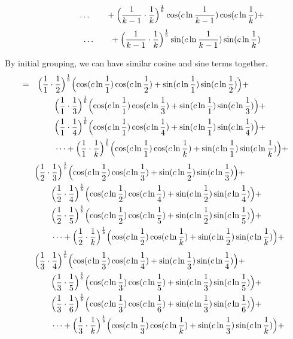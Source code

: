 \documentclass{amsart}
\begin{document}
	\[ \qquad\qquad \dots \qquad + \Bigl( \frac{1}{k-1} \cdot \frac{1}{k} \Bigr)^\frac1b \cos(c \ln \frac{1}{k-1}) \cos(c \ln \frac{1}{k}) +  \]
	\[ \qquad\qquad \dots \qquad + \Bigl( \frac{1}{k-1} \cdot \frac{1}{k} \Bigr)^\frac1b \sin(c \ln \frac{1}{k-1}) \sin(c \ln \frac{1}{k}) \]
	
	\[\]
	By initial grouping, we can have similar cosine and sine terms together.
	\[
	\begin{aligned}
		= \quad & \Bigl( \frac{1}{1} \cdot \frac{1}{2} \Bigr)^\frac1b \Bigl( \cos(c \ln \frac{1}{1}) \cos(c \ln \frac{1}{2}) + \sin(c \ln \frac{1}{1}) \sin(c \ln \frac{1}{2}) \Bigr) + \\
		& \qquad \Bigl( \frac{1}{1} \cdot \frac{1}{3} \Bigr)^\frac1b \Bigl( \cos(c \ln \frac{1}{1}) \cos(c \ln \frac{1}{3}) + \sin(c \ln \frac{1}{1}) \sin(c \ln \frac{1}{3}) \Bigr) + \\
		& \qquad \Bigl( \frac{1}{1} \cdot \frac{1}{4} \Bigr)^\frac1b \Bigl( \cos(c \ln \frac{1}{1}) \cos(c \ln \frac{1}{4}) + \sin(c \ln \frac{1}{1}) \sin(c \ln \frac{1}{4}) \Bigr) + \\
		& \qquad \dots  + \Bigl( \frac{1}{1} \cdot \frac{1}{k} \Bigr)^\frac1b \Bigl( \cos(c \ln \frac{1}{1}) \cos(c \ln \frac{1}{k}) + \sin(c \ln \frac{1}{1}) \sin(c \ln \frac{1}{k}) \Bigr) + 
	\end{aligned}
	\]
	\[
	\begin{aligned}
		\quad & \Bigl( \frac{1}{2} \cdot \frac{1}{3} \Bigr)^\frac1b \Bigl( \cos(c \ln \frac{1}{2}) \cos(c \ln \frac{1}{3}) + \sin(c \ln \frac{1}{2}) \sin(c \ln \frac{1}{3}) \Bigr) + \\
		& \qquad \Bigl( \frac{1}{2} \cdot \frac{1}{4} \Bigr)^\frac1b \Bigl( \cos(c \ln \frac{1}{2}) \cos(c \ln \frac{1}{4}) + \sin(c \ln \frac{1}{2}) \sin(c \ln \frac{1}{4}) \Bigr) + \\
		& \qquad \Bigl( \frac{1}{2} \cdot \frac{1}{5} \Bigr)^\frac1b \Bigl( \cos(c \ln \frac{1}{2}) \cos(c \ln \frac{1}{5}) + \sin(c \ln \frac{1}{2}) \sin(c \ln \frac{1}{5}) \Bigr) + \\
		& \qquad \dots  + \Bigl( \frac{1}{2} \cdot \frac{1}{k} \Bigr)^\frac1b \Bigl( \cos(c \ln \frac{1}{2}) \cos(c \ln \frac{1}{k}) + \sin(c \ln \frac{1}{2}) \sin(c \ln \frac{1}{k}) \Bigr) + 
	\end{aligned}
	\]
	\[
	\begin{aligned}
		\quad & \Bigl( \frac{1}{3} \cdot \frac{1}{4} \Bigr)^\frac1b \Bigl( \cos(c \ln \frac{1}{3}) \cos(c \ln \frac{1}{4}) + \sin(c \ln \frac{1}{3}) \sin(c \ln \frac{1}{4}) \Bigr) + \\
		& \qquad \Bigl( \frac{1}{3} \cdot \frac{1}{5} \Bigr)^\frac1b \Bigl( \cos(c \ln \frac{1}{3}) \cos(c \ln \frac{1}{5}) + \sin(c \ln \frac{1}{3}) \sin(c \ln \frac{1}{5}) \Bigr) + \\
		& \qquad \Bigl( \frac{1}{3} \cdot \frac{1}{6} \Bigr)^\frac1b \Bigl( \cos(c \ln \frac{1}{3}) \cos(c \ln \frac{1}{6}) + \sin(c \ln \frac{1}{3}) \sin(c \ln \frac{1}{6}) \Bigr) + \\
		& \qquad \dots  + \Bigl( \frac{1}{3} \cdot \frac{1}{k} \Bigr)^\frac1b \Bigl( \cos(c \ln \frac{1}{3}) \cos(c \ln \frac{1}{k}) + \sin(c \ln \frac{1}{3}) \sin(c \ln \frac{1}{k}) \Bigr) + 
	\end{aligned}
	\]
\end{document}
